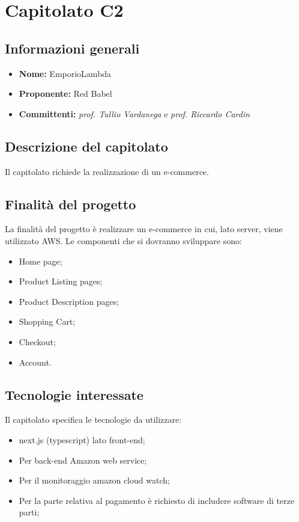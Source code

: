 \section{Capitolato C2}

\subsection{Informazioni generali}
\begin{itemize}
\item \textbf{Nome:} EmporioLambda
\item \textbf{Proponente:} Red Babel
\item \textbf{Committenti:} \textit{prof. Tullio Vardanega} e \textit{prof. Riccardo Cardin}
\end{itemize}

\subsection{Descrizione del capitolato}
Il capitolato richiede la realizzazione di un e-commerce.

\subsection{Finalità del progetto}
La finalità del progetto è realizzare un e-commerce in cui, lato server, viene utilizzato AWS. Le componenti che si dovranno sviluppare sono:
\begin{itemize}
\item Home page;
\item Product Listing pages;
\item Product Description pages;
\item Shopping Cart;
\item Checkout;
\item Account.
\end{itemize}

\subsection{Tecnologie interessate}
Il capitolato specifica le tecnologie da utilizzare:
\begin{itemize}
\item next.js (typescript) lato front-end;
\item Per back-end Amazon web service;
\item Per il monitoraggio amazon cloud watch;
\item Per la parte relativa al pagamento è richiesto di includere software di terze parti;
\end{itemize}


